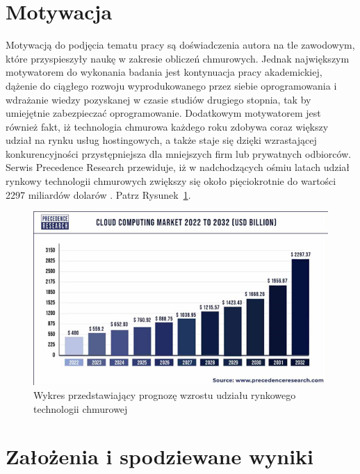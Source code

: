 \documentclass[12pt,twoside]{book}
\newcommand{\captionvspace}{\vspace{6pt}}
\begin{document}
\section{Motywacja}

Motywacją do podjęcia tematu pracy są doświadczenia autora na tle zawodowym, które przyspieszyły naukę w zakresie obliczeń chmurowych. Jednak największym motywatorem do wykonania badania jest kontynuacja pracy akademickiej, dążenie do ciągłego rozwoju wyprodukowanego przez siebie oprogramowania i wdrażanie wiedzy pozyskanej w czasie studiów drugiego stopnia, tak by umiejętnie zabezpieczać oprogramowanie. Dodatkowym motywatorem jest również fakt, iż technologia chmurowa każdego roku zdobywa coraz większy udział na rynku usług hostingowych, a także staje się dzięki wzrastającej konkurencyjności przystępniejsza dla mniejszych firm lub prywatnych odbiorców. Serwis Precedence Research przewiduje, iż w nadchodzących ośmiu latach udział rynkowy technologii chmurowych zwiększy się około pięciokrotnie do wartości 2297 miliardów dolarów \cite{p.research}. Patrz Rysunek~\ref{fig:precedence-research}.

\begin{figure}[ht]
\centering
\includegraphics[width=\textwidth]{includes/images/precedence-research.png}
\captionvspace
\caption{Wykres przedstawiający prognozę wzrostu udziału rynkowego technologii chmurowej}
\label{fig:precedence-research}
\end{figure}

\section{Założenia i spodziewane wyniki}
\end{document}
